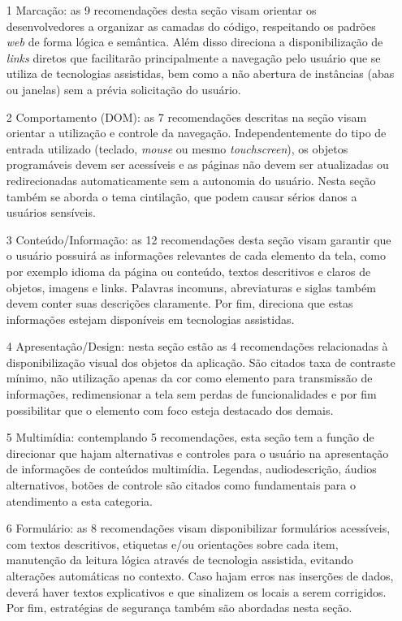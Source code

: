 \begin{itemize}
	\item[1] Marcação: as 9 recomendações desta seção visam orientar os desenvolvedores a organizar as camadas do código, respeitando os padrões \textit{web} de forma lógica e semântica. Além disso direciona a disponibilização de \textit{links} diretos que facilitarão principalmente a navegação pelo usuário que se utiliza de tecnologias assistidas, bem como a não abertura de instâncias (abas ou janelas) sem a prévia solicitação do usuário.
	
	\item[2] Comportamento (DOM): as 7 recomendações descritas na seção visam orientar a utilização e controle da navegação. Independentemente do tipo de entrada utilizado (teclado, \textit{mouse} ou mesmo \textit{touchscreen}), os objetos programáveis devem ser acessíveis e as páginas não devem ser atualizadas ou redirecionadas automaticamente sem a autonomia do usuário. Nesta seção também se aborda o tema cintilação, que podem causar sérios danos a usuários sensíveis.
	
	\item[3] Conteúdo/Informação: as 12 recomendações desta seção visam garantir que o usuário possuirá as informações relevantes de cada elemento da tela, como por exemplo idioma da página ou conteúdo, textos descritivos e claros de objetos, imagens e links. Palavras incomuns, abreviaturas e siglas também devem conter suas descrições claramente. Por fim, direciona que estas informações estejam disponíveis em tecnologias assistidas.

	\item[4] Apresentação/Design: nesta seção estão as 4 recomendações relacionadas à disponibilização visual dos objetos da aplicação. São citados taxa de contraste mínimo, não utilização apenas da cor como elemento para transmissão de informações, redimensionar a tela sem perdas de funcionalidades e por fim possibilitar que o elemento com foco esteja destacado dos demais.
	
	\item[5] Multimídia: contemplando 5 recomendações, esta seção tem a função de direcionar que hajam alternativas e controles para o usuário na apresentação de informações de conteúdos multimídia. Legendas, audiodescrição, áudios alternativos, botões de controle são citados como fundamentais para o atendimento a esta categoria.	
	
	\item[6] Formulário: as 8 recomendações visam disponibilizar formulários acessíveis, com textos descritivos, etiquetas e/ou orientações sobre cada item, manutenção da leitura lógica através de tecnologia assistida, evitando alterações automáticas no contexto. Caso hajam erros nas inserções de dados, deverá haver textos explicativos e que sinalizem os locais a serem corrigidos. Por fim, estratégias de segurança também são abordadas nesta seção.
	
\end{itemize}

